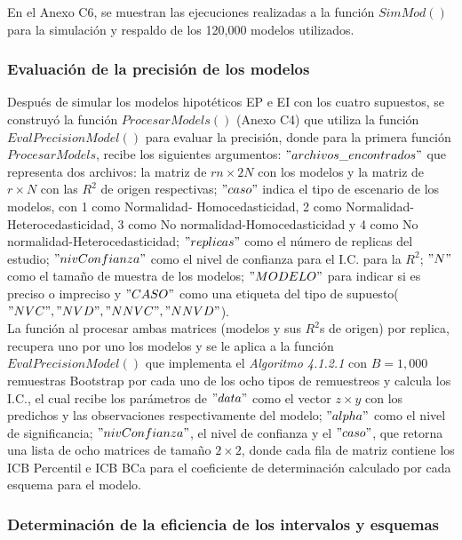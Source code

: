 En el Anexo C6, se muestran las ejecuciones realizadas a la función $SimMod()$ para la simulación y respaldo de los 120,000 modelos utilizados. \\


\subsubsection{Evaluación de la precisión de los modelos}

Después de simular los modelos hipotéticos EP e EI con los cuatro supuestos, se construyó la función $ProcesarModels()$ (Anexo C4) que utiliza la función $EvalPrecisionModel()$ para evaluar la precisión, donde para la primera función $ProcesarModels$, recibe los siguientes argumentos: $"archivos \_ encontrados"$ que representa dos archivos: la matriz de $rn \times 2N$ con los modelos y la matriz de $r \times N$ con las $R^2$ de origen respectivas; $"caso"$ indica el tipo de escenario de los modelos, con 1 como Normalidad- Homocedasticidad, 2 como Normalidad-Heterocedasticidad, 3 como No normalidad-Homocedasticidad y 4 como No normalidad-Heterocedasticidad; $"replicas"$ como el número de replicas del estudio; $"nivConfianza"$ como el nivel de confianza para el I.C. para la $R^2$; $"N"$ como el tamaño de muestra de los modelos; $"MODELO"$ para indicar si es preciso o impreciso y $"CASO"$ como una etiqueta del tipo de supuesto($"NVC","NVD","NNVC","NNVD"$).\\


La función al procesar ambas matrices (modelos y sus $R^2$s de origen) por replica, recupera uno por uno los modelos y se le aplica a la función $EvalPrecisionModel()$ que implementa el \textit{Algoritmo 4.1.2.1} con $B=1,000$ remuestras Bootstrap por cada uno de los ocho tipos de remuestreos y calcula los I.C., el cual recibe los parámetros de $"data"$ como el vector $ z \times y $ con los predichos y las observaciones respectivamente del modelo;  $"alpha"$ como el nivel de significancia; $" nivConfianza" $, el nivel de confianza y el $"caso"$, que retorna una lista de ocho matrices de tamaño $2 \times 2$, donde cada fila de matriz contiene los ICB Percentil e ICB BCa para el coeficiente de determinación calculado por cada esquema para el modelo.\\


\subsubsection{Determinación de la eficiencia de los intervalos y esquemas}

